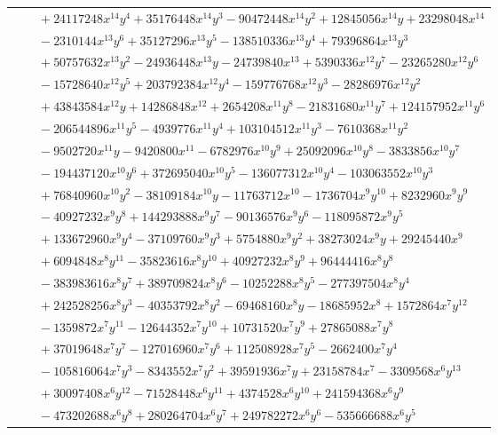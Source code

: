 \documentclass[11pt]{article}
\begin{document}
\begin{longtable}{@{}ll@{}}
 & $\quad +24117248x^{14}y^{4}+35176448x^{14}y^{3}-90472448x^{14}y^{2}+12845056x^{14}y+23298048x^{14}$\\
 & $\quad -2310144x^{13}y^{6}+35127296x^{13}y^{5}-138510336x^{13}y^{4}+79396864x^{13}y^{3}$\\
 & $\quad +50757632x^{13}y^{2}-24936448x^{13}y-24739840x^{13}+5390336x^{12}y^{7}-23265280x^{12}y^{6}$\\
 & $\quad -15728640x^{12}y^{5}+203792384x^{12}y^{4}-159776768x^{12}y^{3}-28286976x^{12}y^{2}$\\
 & $\quad +43843584x^{12}y+14286848x^{12}+2654208x^{11}y^{8}-21831680x^{11}y^{7}+124157952x^{11}y^{6}$\\
 & $\quad -206544896x^{11}y^{5}-4939776x^{11}y^{4}+103104512x^{11}y^{3}-7610368x^{11}y^{2}$\\
 & $\quad -9502720x^{11}y-9420800x^{11}-6782976x^{10}y^{9}+25092096x^{10}y^{8}-3833856x^{10}y^{7}$\\
 & $\quad -194437120x^{10}y^{6}+372695040x^{10}y^{5}-136077312x^{10}y^{4}-103063552x^{10}y^{3}$\\
 & $\quad +76840960x^{10}y^{2}-38109184x^{10}y-11763712x^{10}-1736704x^{9}y^{10}+8232960x^{9}y^{9}$\\
 & $\quad -40927232x^{9}y^{8}+144293888x^{9}y^{7}-90136576x^{9}y^{6}-118095872x^{9}y^{5}$\\
 & $\quad +133672960x^{9}y^{4}-37109760x^{9}y^{3}+5754880x^{9}y^{2}+38273024x^{9}y+29245440x^{9}$\\
 & $\quad +6094848x^{8}y^{11}-35823616x^{8}y^{10}+40927232x^{8}y^{9}+96444416x^{8}y^{8}$\\
 & $\quad -383983616x^{8}y^{7}+389709824x^{8}y^{6}-10252288x^{8}y^{5}-277397504x^{8}y^{4}$\\
 & $\quad +242528256x^{8}y^{3}-40353792x^{8}y^{2}-69468160x^{8}y-18685952x^{8}+1572864x^{7}y^{12}$\\
 & $\quad -1359872x^{7}y^{11}-12644352x^{7}y^{10}+10731520x^{7}y^{9}+27865088x^{7}y^{8}$\\
 & $\quad +37019648x^{7}y^{7}-127016960x^{7}y^{6}+112508928x^{7}y^{5}-2662400x^{7}y^{4}$\\
 & $\quad -105816064x^{7}y^{3}-8343552x^{7}y^{2}+39591936x^{7}y+23158784x^{7}-3309568x^{6}y^{13}$\\
 & $\quad +30097408x^{6}y^{12}-71528448x^{6}y^{11}+4374528x^{6}y^{10}+241594368x^{6}y^{9}$\\
 & $\quad -473202688x^{6}y^{8}+280264704x^{6}y^{7}+249782272x^{6}y^{6}-535666688x^{6}y^{5}$\\

\end{longtable}
\end{document}

